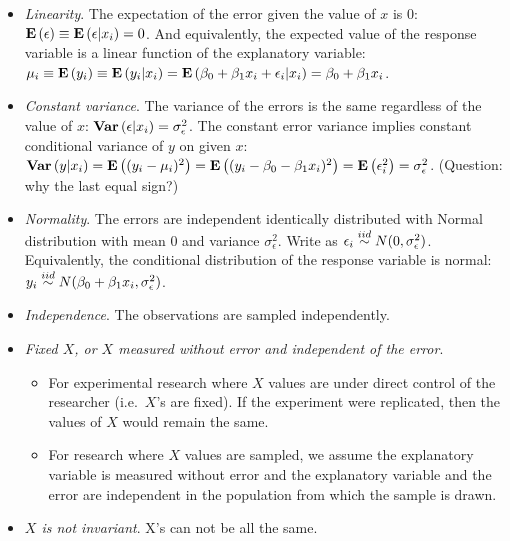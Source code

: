 \begin{itemize}
  \item {\it Linearity}.  The expectation of the error given the value of $x$ is $0$: ${\mathbf{E}\left(\epsilon\right)} \equiv {\mathbf{E}\left(\epsilon | x_i\right)} = 0$.  And equivalently, the expected value of the response variable is a linear function of the explanatory variable:
  $\mu_i \equiv {\mathbf{E}\left(y_i\right)} \equiv {\mathbf{E}\left(y_i | x_i\right)} = {\mathbf{E}\left(\beta_0 + \beta_1 x_i + \epsilon_i | x_i\right)} = \beta_0 + \beta_1 x_i$.
  \item {\it Constant variance}.  The variance of the errors is the same regardless of the value of $x$: $\mathbf{Var}\left(\epsilon | x_i\right) = \sigma^2_\epsilon$.  The constant error variance implies constant conditional variance of $y$ on given $x$:
  $\mathbf{Var}\left(y|x_i\right) = {\mathbf{E}\left((y_i - \mu_i)^2\right)} = {\mathbf{E}\left((y_i - \beta_0 - \beta_1 x_i)^2\right)} = {\mathbf{E}\left(\epsilon_i^2\right)} = \sigma^2_\epsilon$.  (Question: why the last equal sign?)
  \item {\it Normality}.  The errors are independent identically distributed with Normal distribution with mean $0$ and variance $\sigma_\epsilon^2$.  Write as $\epsilon_i \overset{iid}{\sim} N(0, \sigma_\epsilon^2)$.
  Equivalently, the conditional distribution of the response variable is normal: $y_i \overset{iid}{\sim} N(\beta_0 + \beta_1 x_i, \sigma_\epsilon^2)$.
  \item {\it Independence}.  The observations are sampled independently.
  \item {\it Fixed $X$, or $X$ measured without error and independent of the error}.
    \begin{itemize}
      \item For experimental research where $X$ values are under direct control of the researcher (i.e.~$X$'s are fixed).  If the experiment were replicated, then the values of $X$ would remain the same.
      \item For research where $X$ values are sampled, we assume the explanatory variable is measured without error and the explanatory variable and the error are independent in the population from which the sample is drawn.
    \end{itemize}
  \item {\it $X$ is not invariant}. X's can not be all the same.
\end{itemize}

